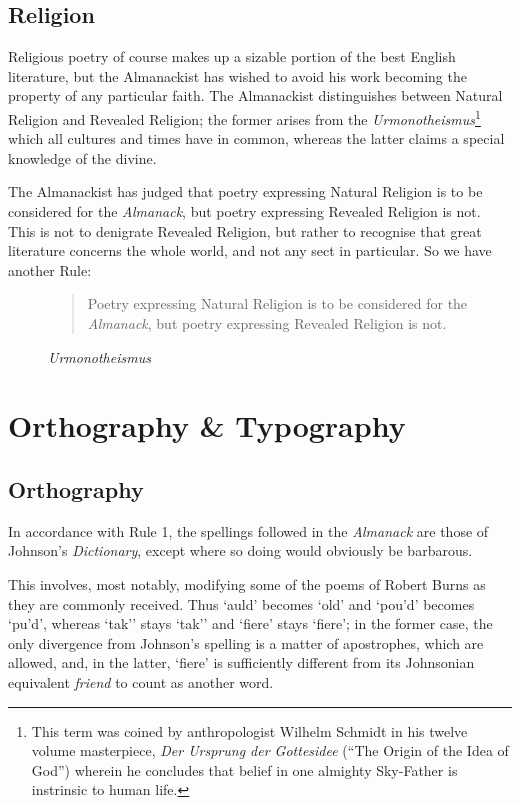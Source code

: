 \documentclass[0main.tex]{subfiles}
\begin{document}
\subsection{Religion}

Religious poetry of course makes up a sizable portion of the best English literature, but the Almanackist has wished to avoid his work becoming the property of any particular faith. The Almanackist distinguishes between Natural Religion and Revealed Religion; the former arises from the \emph{Urmonotheismus}\footnote{This term was coined by anthropologist Wilhelm Schmidt in his twelve volume masterpiece, \emph{Der Ursprung der Gottesidee} (``The Origin of the Idea of God'') wherein he concludes that belief in one almighty Sky-Father is instrinsic to human life.} which all cultures and times have in common, whereas the latter claims a special knowledge of the divine.

The Almanackist has judged that poetry expressing Natural Religion is to be considered for the \emph{Almanack}, but poetry expressing Revealed Religion is not. This is not to denigrate Revealed Religion, but rather to recognise that great literature concerns the whole world, and not any sect in particular. So we have another Rule:

\begin{figure}[h]
\caption{\it Urmonotheismus}
\begin{quote}
Poetry expressing Natural Religion is to be considered for the \emph{Almanack}, but poetry expressing Revealed Religion is not.
\end{quote}
\end{figure}

\section{Orthography \& Typography}

\subsection{Orthography}

In accordance with Rule 1, the spellings followed in the \emph{Almanack} are those of Johnson's \emph{Dictionary}, except where so doing would obviously be barbarous.

This involves, most notably, modifying some of the poems of Robert Burns as they are commonly received. Thus `auld' becomes `old' and `pou'd' becomes `pu'd', whereas `tak'' stays `tak'' and `fiere' stays `fiere'; in the former case, the only divergence from Johnson's spelling is a matter of apostrophes, which are allowed, and, in the latter, `fiere' is sufficiently different from its Johnsonian equivalent \emph{friend} to count as another word.
\end{document}
